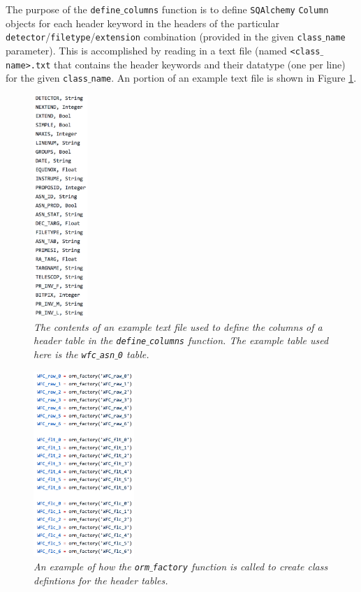 \documentclass[10pt,journal,compsoc]{IEEEtran}
\begin{document}
The purpose of the \texttt{define$\_$columns} function is to define \texttt{SQAlchemy} \texttt{Column} objects for each header keyword in the headers of the particular
\texttt{detector}/\texttt{filetype}/\texttt{extension} combination (provided in the given \texttt{class$\_$name} parameter).  This is accomplished by reading in a text file
(named \texttt{<class$\_$name>.txt} that contains the header keywords and their datatype (one per line) for the given \texttt{class$\_$name}. An portion of an example text file
is shown in Figure \ref{fig17}.

\begin{figure}[!h]
\centering
\includegraphics[width=0.8in]{./figures/table_definition.png}
\caption{\textit{The contents of an example text file used to define the columns of a header table in the \texttt{define$\_$columns} function. The example table used here is
the \texttt{wfc$\_$asn$\_$0} table.}}
\label{fig17}
\end{figure}

\begin{figure}[!h]
\centering
\includegraphics[width=1.5in]{./figures/orm_factory_calls.png}
\caption{\textit{An example of how the \texttt{orm$\_$factory} function is called to create class defintions for the header tables.}}
\label{fig18}
\end{figure}
\end{document}
